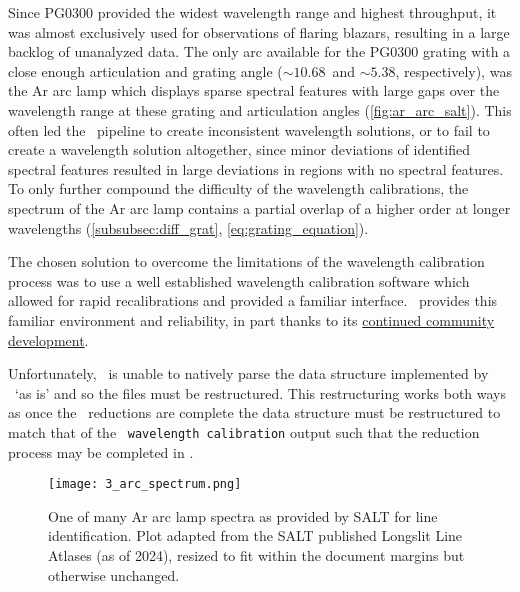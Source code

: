 Since PG$0300$ provided the widest wavelength range and highest throughput, it was almost exclusively used for observations of flaring blazars, resulting in a large backlog of unanalyzed data.
The only arc available for the PG$0300$ grating with a close enough articulation and grating angle ($\sim 10.68$\degree\ and $\sim 5.38$\degree, respectively), was the \gls{Ar} arc lamp which displays sparse spectral features with large gaps over the wavelength range at these grating and articulation angles (\autoref{fig:ar_arc_salt}).
This often led the \polsalt\ pipeline to create inconsistent wavelength solutions, or to fail to create a wavelength solution altogether, since minor deviations of identified spectral features resulted in large deviations in regions with no spectral features.
To only further compound the difficulty of the wavelength calibrations, the spectrum of the \gls{Ar} arc lamp contains a partial overlap of a higher order at longer wavelengths (\autoref{subsubsec:diff_grat}, \autoref{eq:grating_equation}).

The chosen solution to overcome the limitations of the wavelength calibration process was to use a well established wavelength calibration software which allowed for rapid recalibrations and provided a familiar interface.
\iraf\ provides this familiar environment and reliability, in part thanks to its \href{https://github.com/iraf-community/iraf}{continued community development}.

Unfortunately, \iraf\ is unable to natively parse the data structure implemented by \polsalt\ `as is' and so the files must be restructured.
This restructuring works both ways as once the \iraf\ reductions are complete the data structure must be restructured to match that of the \polsalt\ \texttt{wavelength calibration} output such that the reduction process may be completed in \polsalt.

\begin{figure}[t]
    \centering
    \texttt{[image: 3\_arc\_spectrum.png]}
    \caption{
        One of many \gls{Ar} arc lamp spectra as provided by \gls{SALT} for line identification.
        Plot adapted from the \gls{SALT} published Longslit Line Atlases (as of 2024), resized to fit within the document margins but otherwise unchanged.\protect\footnotemark
    }
    \label{fig:ar_arc_salt}
\end{figure}

